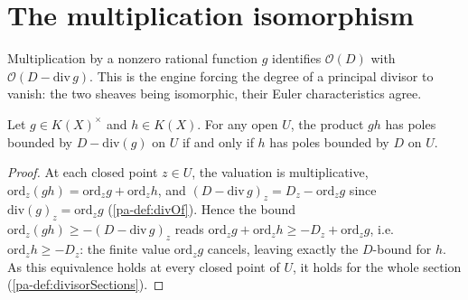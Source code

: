 \section{The multiplication isomorphism}

Multiplication by a nonzero rational function \(g\) identifies \(\mathcal O(D)\) with
\(\mathcal O(D - \mathrm{div}\, g)\). This is the engine forcing the degree of a principal divisor
to vanish: the two sheaves being isomorphic, their Euler characteristics agree.

\begin{theorem}
  \label{pa-thm:mem_boundedSections_mul_iff}
  \leanok

  Let \(g \in K(X)^\times\) and \(h \in K(X)\). For any open \(U\), the product \(g h\) has poles
  bounded by \(D - \mathrm{div}(g)\) on \(U\) if and only if \(h\) has poles bounded by \(D\) on
  \(U\).
\end{theorem}
\begin{proof}
  \leanok
  At each closed point \(z \in U\), the valuation is multiplicative, \(\mathrm{ord}_z(gh) =
  \mathrm{ord}_z g + \mathrm{ord}_z h\), and \((D - \mathrm{div}\, g)_z = D_z - \mathrm{ord}_z g\)
  since \(\mathrm{div}(g)_z = \mathrm{ord}_z g\) (\ref{pa-def:divOf}). Hence the bound
  \(\mathrm{ord}_z(gh) \ge -(D - \mathrm{div}\, g)_z\) reads
  \(\mathrm{ord}_z g + \mathrm{ord}_z h \ge -D_z + \mathrm{ord}_z g\), i.e.\ \(\mathrm{ord}_z h \ge
  -D_z\): the finite value \(\mathrm{ord}_z g\) cancels, leaving exactly the \(D\)-bound for \(h\).
  As this equivalence holds at every closed point of \(U\), it holds for the whole section
  (\ref{pa-def:divisorSections}).
\end{proof}

